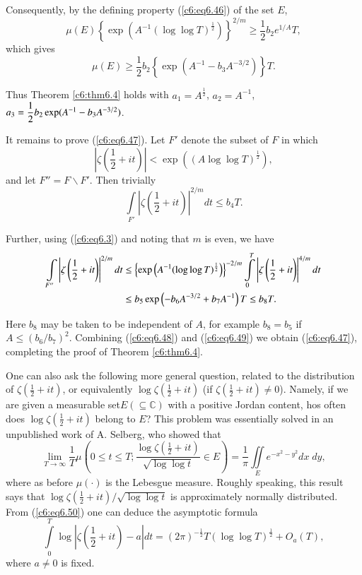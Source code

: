 Consequently, by the defining property (\ref{c6:eq6.46}) of the set
$E$, 
$$
\mu(E) \left\{ \exp \left(A^{-1} (\log \log T)^{\frac{1}{2}}\right)
\right\}^{2/m} \geq \frac{1}{2} b_2 e^{1/A} T, 
$$
which gives
$$
\mu(E) \geq \frac{1}{2} b_2 \left\{\exp \left(A^{-1} - b_3
A^{-3/2}\right) \right\} T. 
$$

Thus Theorem \ref{c6:thm6.4} holds with $a_1 = A^{\frac{1}{2}}$, $a_2
= A^{-1}$, $a_3 = \dfrac{1}{2} b_2 \exp\break (A^{-1} - b_3 A^{-3/2})$. 

It remains to prove (\ref{c6:eq6.47}). Let $F'$ denote the subset of
$F$ in which 
$$
\left|\zeta \left(\frac{1}{2} + it \right)\right| < \exp \left((A \log
\log T)^{\frac{1}{2}}\right), 
$$
and let $F'' = F \backslash F'$. Then trivially
\begin{equation}
\int\limits_{F'} \left|\zeta \left(\frac{1}{2} + it
\right)\right|^{2/m} dt \leq b_4 T.\label{c6:eq6.48}
\end{equation}

Further, using (\ref{c6:eq6.3}) and noting that $m$ is even, we have
{\fontsize{10pt}{12pt}\selectfont
\begin{align}
\int\limits_{F''} \left|\zeta \left(\frac{1}{2} + it
\right)\right|^{2/m} dt & \leq \left\{ \exp \left(A^{-1} (\log \log
T)^{\frac{1}{2}}\right) \right\}^{-2/m} \int\limits^T_0 \left|\zeta
\left(\frac{1}{2}+it \right)\right|^{4/m} dt\notag\\
& \leq b_5 \exp \left(-b_6 A^{-3/2} + b_7 A^{-1}\right) T \leq b_8
T.\label{c6:eq6.49}
\end{align}}

Here $b_8$ may be taken to be independent of $A$, for example $b_8 =
b_5$ if $A \leq (b_6 / b_7)^2$. Combining (\ref{c6:eq6.48}) and
(\ref{c6:eq6.49}) we obtain (\ref{c6:eq6.47}), completing the proof of
Theorem \ref{c6:thm6.4}.  

One can also ask the following more general question, related to the
distribution of $\zeta(\frac{1}{2} + it)$, or equivalently $\log
\zeta(\frac{1}{2} + it)$ (if $\zeta(\frac{1}{2} + it) \neq
0$). Namely, if we are given a measurable set\pageoriginale $E
(\subseteq \mathbb{C})$ with a positive Jordan content, hos often does
$\log \zeta(\frac{1}{2} + it)$ belong to $E$? This problem was
essentially solved in an unpublished work of A. Selberg, who showed
that 
\begin{equation}
\lim\limits_{T \to \infty} \frac{1}{T} \mu \left(0 \leq t \leq T;
\frac{\log \zeta (\frac{1}{2} + it)}{\sqrt{\log \log t}} \in E \right)
= \frac{1}{\pi} \iint\limits_E e^{-x^2 -y^2} dx \; dy,\label{c6:eq6.50} 
\end{equation}
where as before $\mu(\cdot)$ is the Lebesgue measure. Roughly
speaking, this result says that $\log\zeta(\frac{1}{2} + it) /
\sqrt{\log \log t}$ is approximately normally distributed. From
(\ref{c6:eq6.50}) one can deduce the asymptotic formula 
\begin{equation}
\int\limits^T_0 \log \left|\zeta \left(\frac{1}{2} + it \right)
-a\right| dt = (2\pi)^{-\frac{1}{2}} T (\log \log T)^{\frac{1}{2}} +
O_a (T), \label{c6:eq6.51} 
\end{equation}
where $a \neq 0$ is fixed.

